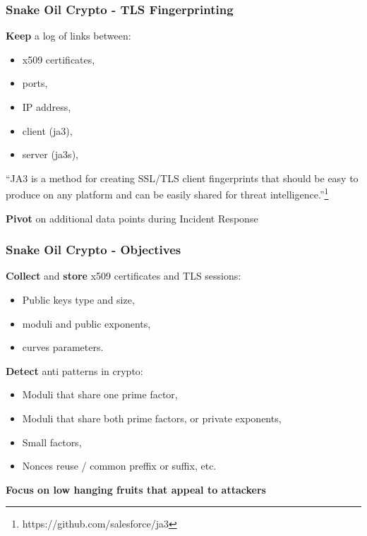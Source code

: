 \documentclass{beamer}
\begin{document}
\begin{frame}
  \frametitle{Snake Oil Crypto - TLS Fingerprinting}
        {\bf Keep} a log of links between:
        \begin{itemize}
          \item x509 certificates,
          \item ports,
          \item IP address,
          \item client (ja3),
          \item server (ja3s),
        \end{itemize}
        \begin{displayquote}
        ``JA3 is a method for creating SSL/TLS client fingerprints that should be easy to produce on any platform and can be easily shared for threat intelligence.''\footnote{https://github.com/salesforce/ja3}
        \end{displayquote}

         {\bf Pivot} on additional data points during Incident Response 
\end{frame}

\begin{frame}
   \frametitle{Snake Oil Crypto -  Objectives}
   {\bf Collect} and {\bf store} x509 certificates and TLS sessions:
        \begin{itemize}
        \item Public keys type and size,
        \item moduli and public exponents,
        \item curves parameters.
        \end{itemize}
        {\bf Detect} anti patterns in crypto:
        \begin{itemize}
          \item Moduli that share one prime factor,
          \item Moduli that share both prime factors, or private exponents,
          \item Small factors,
          \item Nonces reuse / common preffix or suffix, etc. 
        \end{itemize}
        \vspace{5 mm}
        {\bf Focus on low hanging fruits that appeal to attackers}
\end{frame}
\end{document}
